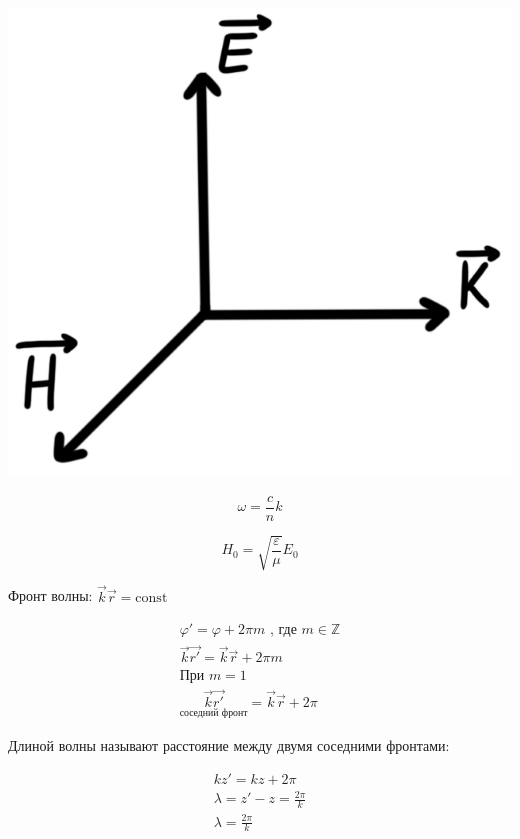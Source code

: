\begin{minipage}[c]{0.2\textwidth} %
    \includegraphics[width=\textwidth]{im/98.png}%
\end{minipage}%
\hfill
\begin{minipage}[c]{0.6\textwidth} %
    \[
    \omega=\frac{c}{n}k 
    \]  

    \[
    H_0=\sqrt{\frac{\varepsilon}{\mu} }E_0
    \]
\end{minipage}

Фронт волны: \( \vec{k}\vec{r}=\mathrm{const}  \) 


\begin{gather*}
    \varphi'=\varphi+2\pi m \text{ , где } m \in  \mathbb{Z} \\
    \vec{k}\vec{r'}=\vec{k}\vec{r}+2\pi m \\
    \text{При } m=1 \\
    \underset{\text{соседний фронт}}{\vec{k}\vec{r'}}=\vec{k}\vec{r}+2\pi
\end{gather*}

Длиной волны называют расстояние между двумя соседними фронтами:

\begin{gather*}
    kz'=kz+2\pi \\
    \lambda=z'-z=\frac{2\pi}{k} \\
    \boxed{\lambda=\frac{2\pi}{k}} 
\end{gather*}


